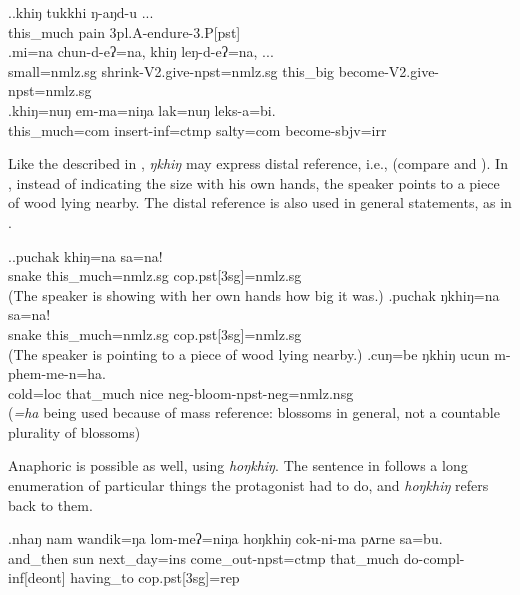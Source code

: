 \ex.\ag.khiŋ     tukkhi ŋ-aŋd-u ...\\
this\_much pain {\sc 3pl.A-}endure{\sc -3.P[pst]}\\
  
\bg.mi=na  chun-d-eʔ=na,   khiŋ    leŋ-d-eʔ=na, ... \\
small{\sc =nmlz.sg} shrink{\sc [3sg]-V2.give-npst=nmlz.sg} this\_big become{\sc [3sg]-V2.give-npst=nmlz.sg}\\
  
\bg.khiŋ=nuŋ em-ma=niŋa lak=nuŋ leks-a=bi.\\
this\_much{\sc =com} insert{\sc -inf=ctmp} salty{\sc =com} become{\sc [3sg]-sbjv=irr}\\

Like the  described in , \emph{ŋkhiŋ} may express distal reference, i.e.,  (compare \Next[a] and \Next[b]). In \Next[b], instead of indicating the size with his own hands, the speaker points to a piece of wood lying nearby. The distal reference is also used in general statements, as in \Next[c].

\ex.\ag.puchak khiŋ=na sa=na!\\
snake this\_much{\sc =nmlz.sg} {\sc cop.pst[3sg]=nmlz.sg}\\
 (The speaker is showing with her own hands how big it was.)
\bg.puchak ŋkhiŋ=na sa=na!\\
snake this\_much{\sc =nmlz.sg} {\sc cop.pst[3sg]=nmlz.sg}\\
 (The speaker is pointing to a piece of wood lying nearby.)
\bg.cuŋ=be ŋkhiŋ ucun m-phem-me-n=ha.\\
cold{\sc =loc} that\_much nice {\sc neg-}bloom{\sc [3sg]-npst-neg=nmlz.nsg}\\
 (\emph{=ha} being used because of mass reference: blossoms in general, not a countable plurality of blossoms) 

 
Anaphoric  is possible as well, using \emph{hoŋkhiŋ}. The sentence in \Next follows a long enumeration of particular things the protagonist had to do, and \emph{hoŋkhiŋ} refers back to them.

\exg.nhaŋ    nam wandik=ŋa lom-meʔ=niŋa        hoŋkhiŋ cok-ni-ma           pʌrne    sa=bu.\\
and\_then sun next\_day{\sc =ins} come\_out{\sc [3sg]-npst=ctmp} that\_much do{\sc -compl-inf[deont]} having\_to {\sc cop.pst[3sg]=rep}\\
  

